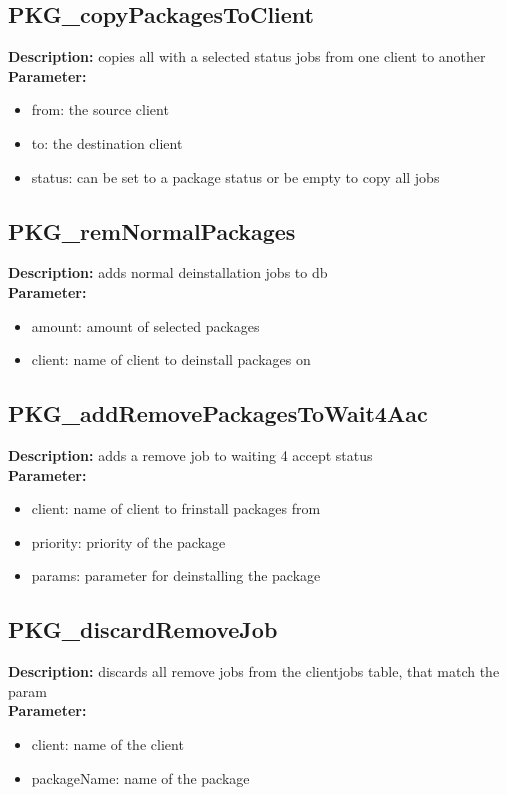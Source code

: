 \subsection{PKG\_copyPackagesToClient}
\textbf{Description:} copies all with a selected status jobs from one client to another\\
\textbf{Parameter:}
\begin{itemize}
\item from: the source client
\item to: the destination client
\item status: can be set to a package status or be empty to copy all jobs
\end{itemize}

\subsection{PKG\_remNormalPackages}
\textbf{Description:} adds normal deinstallation jobs to db\\
\textbf{Parameter:}
\begin{itemize}
\item amount: amount of selected packages
\item client: name of client to deinstall packages on
\end{itemize}

\subsection{PKG\_addRemovePackagesToWait4Aac}
\textbf{Description:} adds a remove job to waiting 4 accept status\\
\textbf{Parameter:}
\begin{itemize}
\item client: name of client to frinstall packages from
\item priority: priority of the package
\item params: parameter for deinstalling the package
\end{itemize}

\subsection{PKG\_discardRemoveJob}
\textbf{Description:} discards all remove jobs from the clientjobs table, that match the param\\
\textbf{Parameter:}
\begin{itemize}
\item client: name of the client
\item packageName: name of the package
\end{itemize}

